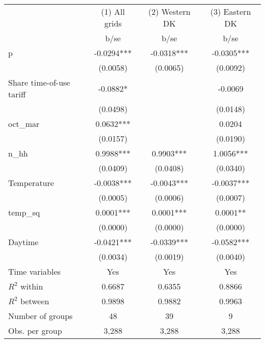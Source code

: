 \begin{tabular}{lccc}\toprule
                    &(1) All grids   &(2) Western DK   &(3) Eastern DK   \\
                    &        b/se   &        b/se   &        b/se   \\
\midrule
p                   &     -0.0294***&     -0.0318***&     -0.0305***\\
                    &    (0.0058)   &    (0.0065)   &    (0.0092)   \\
Share time-of-use tariff&     -0.0882*  &               &     -0.0069   \\
                    &    (0.0498)   &               &    (0.0148)   \\
oct_mar             &      0.0632***&               &      0.0204   \\
                    &    (0.0157)   &               &    (0.0190)   \\
n_hh                &      0.9988***&      0.9903***&      1.0056***\\
                    &    (0.0409)   &    (0.0408)   &    (0.0340)   \\
Temperature         &     -0.0038***&     -0.0043***&     -0.0037***\\
                    &    (0.0005)   &    (0.0006)   &    (0.0007)   \\
temp_sq             &      0.0001***&      0.0001***&      0.0001** \\
                    &    (0.0000)   &    (0.0000)   &    (0.0000)   \\
Daytime             &     -0.0421***&     -0.0339***&     -0.0582***\\
                    &    (0.0034)   &    (0.0019)   &    (0.0040)   \\
Time variables      &         Yes   &         Yes   &         Yes   \\
\midrule
\(R^2\) within      &      0.6687   &      0.6355   &      0.8866   \\
\(R^2\) between     &      0.9898   &      0.9882   &      0.9963   \\
Number of groups    &          48   &          39   &           9   \\
Obs. per group      &       3,288   &       3,288   &       3,288   \\
\bottomrule\end{tabular}
